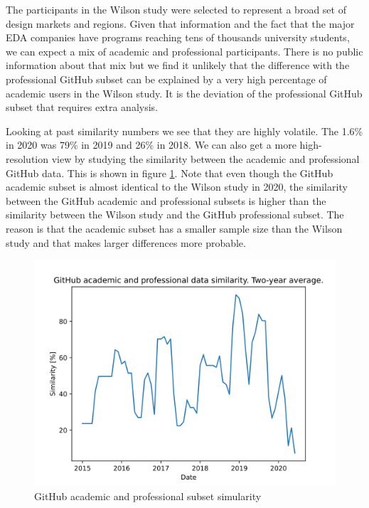 \documentclass[]{article}
\begin{document}
The participants in the Wilson study were selected to represent a broad set of design markets and regions. Given that information and the fact that the major EDA companies have programs reaching tens of thousands university students, we can expect a mix of academic and professional participants. There is no public information about that mix but we find it unlikely that the difference with the professional GitHub subset can be explained by a very high percentage of academic users in the Wilson study. It is the deviation of the professional GitHub subset that requires extra analysis.

Looking at past similarity numbers we see that they are highly volatile. The 1.6\% in 2020 was 79\% in 2019 and 26\% in 2018. We can also get a more high-resolution view by studying the similarity between the academic and professional GitHub data. This is shown in figure \ref{fig:github-academic-professional-comparison}. Note that even though the GitHub academic subset is almost identical to the Wilson study in 2020, the similarity between the GitHub academic and professional subsets is higher than the similarity between the Wilson study and the GitHub professional subset. The reason is that the academic subset has a smaller sample size than the Wilson study and that makes larger differences more probable.

\begin{figure}

{\centering \includegraphics[width=0.85\linewidth]{img/github_academic_professional_comparison} 

}

\caption{GitHub academic and professional subset simularity}\label{fig:github-academic-professional-comparison}
\end{figure}
\end{document}
